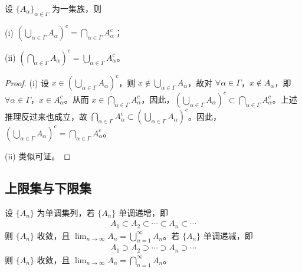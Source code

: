 \documentclass[../../main.tex]{subfiles}
\begin{document}
\begin{theorem}[De Morgan定律]\label{theorem:De Morgan定律}
设 \(\{A_{\alpha}\}_{\alpha \in \varGamma}\) 为一集族，则

(i) \((\bigcup_{\alpha \in \varGamma} A_{\alpha})^c = \bigcap_{\alpha \in \varGamma} A_{\alpha}^c\)；

(ii) \((\bigcap_{\alpha \in \varGamma} A_{\alpha})^c = \bigcup_{\alpha \in \varGamma} A_{\alpha}^c\)。
\end{theorem}
\begin{proof}
(i) 设 \(x \in (\bigcup_{\alpha \in \varGamma} A_{\alpha})^c\)，则 \(x \notin \bigcup_{\alpha \in \varGamma} A_{\alpha}\)，故对 \(\forall \alpha \in \varGamma\)，\(x \notin A_{\alpha}\)，即 \(\forall \alpha \in \varGamma\)，\(x \in A_{\alpha}^c\)。从而 \(x \in \bigcap_{\alpha \in \varGamma} A_{\alpha}^c\)，因此，\((\bigcup_{\alpha \in \varGamma} A_{\alpha})^c \subset \bigcap_{\alpha \in \varGamma} A_{\alpha}^c\)。上述推理反过来也成立，故 \(\bigcap_{\alpha \in \varGamma} A_{\alpha}^c \subset (\bigcup_{\alpha \in \varGamma} A_{\alpha})^c\)。因此，\((\bigcup_{\alpha \in \varGamma} A_{\alpha})^c = \bigcap_{\alpha \in \varGamma} A_{\alpha}^c\)。

(ii) 类似可证。 
\end{proof}


\subsection{上限集与下限集}

设 $\{A_n\}$ 为单调集列，若 $\{A_n\}$ 单调递增，即
\begin{align*}
A_1 \subset A_2 \subset \cdots \subset A_n \subset \cdots
\end{align*}
则 $\{A_n\}$ 收敛，且 $\lim_{n \to \infty} A_n = \bigcup_{n = 1}^{\infty} A_n$。若 $\{A_n\}$ 单调递减，即
\begin{align*}
A_1 \supset A_2 \supset \cdots \supset A_n \supset \cdots
\end{align*}
则 $\{A_n\}$ 收敛，且 $\lim_{n \to \infty} A_n = \bigcap_{n = 1}^{\infty} A_n$。
\end{document}
